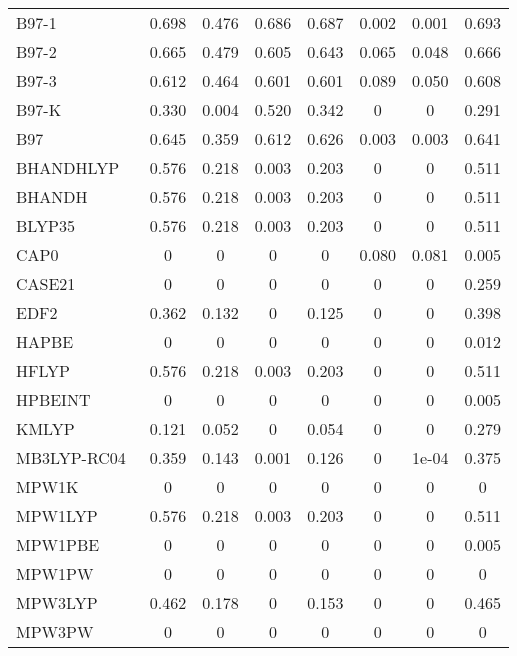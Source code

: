 \begin{table*}
\begin{tabular}{|l|c|c|c|c|c|c|c|}
B97-1~\cite{Hamprecht1998_6264} & 0.698 & 0.476 & 0.686 & 0.687 & 0.002 & 0.001 & 0.693 \\
B97-2~\cite{Wilson2001_9233} & 0.665 & 0.479 & 0.605 & 0.643 & 0.065 & 0.048 & 0.666 \\
B97-3~\cite{Keal2005_121103} & 0.612 & 0.464 & 0.601 & 0.601 & 0.089 & 0.050 & 0.608 \\
B97-K~\cite{Boese2004_3405} & 0.330 & 0.004 & 0.520 & 0.342 & 0 & 0 & 0.291 \\
B97~\cite{Becke1997_8554} & 0.645 & 0.359 & 0.612 & 0.626 & 0.003 & 0.003 & 0.641 \\
BHANDHLYP~\cite{Becke1993_1372,gaussianimplementation} & 0.576 & 0.218 & 0.003 & 0.203 & 0 & 0 & 0.511 \\
BHANDH~\cite{Becke1993_1372,gaussianimplementation} & 0.576 & 0.218 & 0.003 & 0.203 & 0 & 0 & 0.511 \\
BLYP35~\cite{Renz2009_16292,Kaupp2011_16973} & 0.576 & 0.218 & 0.003 & 0.203 & 0 & 0 & 0.511 \\
CAP0~\cite{Carmona2016_120} & 0 & 0 & 0 & 0 & 0.080 & 0.081 & 0.005 \\
CASE21~\cite{Sparrow2022_6896} & 0 & 0 & 0 & 0 & 0 & 0 & 0.259 \\
EDF2~\cite{Lin2004_365} & 0.362 & 0.132 & 0 & 0.125 & 0 & 0 & 0.398 \\
HAPBE~\cite{Fabiano2015_122} & 0 & 0 & 0 & 0 & 0 & 0 & 0.012 \\
HFLYP~\cite{Lee1988_785,Miehlich1989_200} & 0.576 & 0.218 & 0.003 & 0.203 & 0 & 0 & 0.511 \\
HPBEINT~\cite{Fabiano2013_673} & 0 & 0 & 0 & 0 & 0 & 0 & 0.005 \\
KMLYP~\cite{Kang2001_11040} & 0.121 & 0.052 & 0 & 0.054 & 0 & 0 & 0.279 \\
MB3LYP-RC04~\cite{Tognetti2007_381} & 0.359 & 0.143 & 0.001 & 0.126 & 0 & 1e-04 & 0.375 \\
MPW1K~\cite{Lynch2000_4811} & 0 & 0 & 0 & 0 & 0 & 0 & 0 \\
MPW1LYP~\cite{Adamo1998_664} & 0.576 & 0.218 & 0.003 & 0.203 & 0 & 0 & 0.511 \\
MPW1PBE~\cite{Adamo1998_664} & 0 & 0 & 0 & 0 & 0 & 0 & 0.005 \\
MPW1PW~\cite{Adamo1998_664} & 0 & 0 & 0 & 0 & 0 & 0 & 0 \\
MPW3LYP~\cite{Zhao2004_6908} & 0.462 & 0.178 & 0 & 0.153 & 0 & 0 & 0.465 \\
MPW3PW~\cite{Adamo1998_664} & 0 & 0 & 0 & 0 & 0 & 0 & 0 \\

\end{tabular}
\end{table*}
